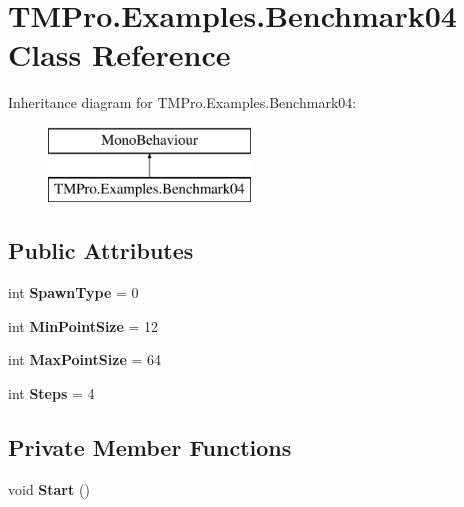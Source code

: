 \hypertarget{class_t_m_pro_1_1_examples_1_1_benchmark04}{}\section{T\+M\+Pro.\+Examples.\+Benchmark04 Class Reference}
\label{class_t_m_pro_1_1_examples_1_1_benchmark04}
Inheritance diagram for T\+M\+Pro.\+Examples.\+Benchmark04\+:\begin{figure}[H]
\begin{center}
\leavevmode
\includegraphics[height=2.000000cm]{class_t_m_pro_1_1_examples_1_1_benchmark04}
\end{center}
\end{figure}
\subsection*{Public Attributes}
\begin{DoxyCompactItemize}
\item 
\mbox{\label{class_t_m_pro_1_1_examples_1_1_benchmark04_ae0ed0b5b3b4420880d61a9898689b99b}} 
int {\bfseries Spawn\+Type} = 0
\item 
\mbox{\label{class_t_m_pro_1_1_examples_1_1_benchmark04_a85eba46098210950a9d7c3d05ed3ff66}} 
int {\bfseries Min\+Point\+Size} = 12
\item 
\mbox{\label{class_t_m_pro_1_1_examples_1_1_benchmark04_ac46a1dbaedb058606168ac613b37e4a7}} 
int {\bfseries Max\+Point\+Size} = 64
\item 
\mbox{\label{class_t_m_pro_1_1_examples_1_1_benchmark04_abf9ed65203897e474c369e98aa8fa325}} 
int {\bfseries Steps} = 4
\end{DoxyCompactItemize}
\subsection*{Private Member Functions}
\begin{DoxyCompactItemize}
\item 
\mbox{\label{class_t_m_pro_1_1_examples_1_1_benchmark04_a2c62d8d74ee70722e0a324c46d244597}} 
void {\bfseries Start} ()
\end{DoxyCompactItemize}
